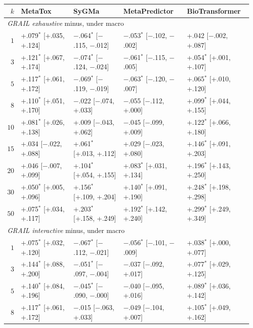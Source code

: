 \begin{table}[h]
\begin{threeparttable}
\begin{tabular}{rllll}
\toprule
$k$ & MetaTox & SyGMa & MetaPredictor & BioTransformer \\
\midrule
\multicolumn{5}{l}{\emph{GRAIL exhaustive} minus, under macro} \\
$1$ & +.079$^{*}$ [+.035, +.124] & $-$.064$^{*}$ [$-$.115, $-$.012] & $-$.053$^{*}$ [$-$.102, $-$.002] & +.042\phantom{$^{*}$} [$-$.002, +.087] \\
$3$ & +.121$^{*}$ [+.067, +.174] & $-$.074$^{*}$ [$-$.124, $-$.024] & $-$.061$^{*}$ [$-$.115, $-$.005] & +.054$^{*}$ [+.001, +.107] \\
$5$ & +.117$^{*}$ [+.061, +.172] & $-$.069$^{*}$ [$-$.119, $-$.019] & $-$.063$^{*}$ [$-$.120, $-$.007] & +.065$^{*}$ [+.010, +.120] \\
$8$ & +.110$^{*}$ [+.051, +.170] & $-$.022\phantom{$^{*}$} [$-$.074, +.033] & $-$.055\phantom{$^{*}$} [$-$.112, +.000] & +.099$^{*}$ [+.044, +.155] \\
$10$ & +.081$^{*}$ [+.026, +.138] & +.009\phantom{$^{*}$} [$-$.043, +.062] & $-$.045\phantom{$^{*}$} [$-$.099, +.009] & +.122$^{*}$ [+.066, +.180] \\
$15$ & +.034\phantom{$^{*}$} [$-$.022, +.088] & +.061$^{*}$ [+.013, +.112] & +.029\phantom{$^{*}$} [$-$.023, +.080] & +.146$^{*}$ [+.091, +.203] \\
$20$ & +.046\phantom{$^{*}$} [$-$.007, +.099] & +.104$^{*}$ [+.054, +.155] & +.083$^{*}$ [+.031, +.134] & +.196$^{*}$ [+.143, +.250] \\
$30$ & +.050$^{*}$ [+.005, +.096] & +.156$^{*}$ [+.109, +.204] & +.140$^{*}$ [+.091, +.190] & +.248$^{*}$ [+.198, +.298] \\
$50$ & +.075$^{*}$ [+.034, +.117] & +.203$^{*}$ [+.158, +.249] & +.192$^{*}$ [+.142, +.240] & +.299$^{*}$ [+.249, +.349] \\
\midrule
\multicolumn{5}{l}{\emph{GRAIL interactive} minus, under macro} \\
$1$ & +.075$^{*}$ [+.032, +.120] & $-$.067$^{*}$ [$-$.112, $-$.021] & $-$.056$^{*}$ [$-$.101, $-$.009] & +.038$^{*}$ [+.000, +.077] \\
$3$ & +.144$^{*}$ [+.088, +.200] & $-$.051$^{*}$ [$-$.097, $-$.004] & $-$.037\phantom{$^{*}$} [$-$.092, +.017] & +.077$^{*}$ [+.029, +.125] \\
$5$ & +.140$^{*}$ [+.084, +.196] & $-$.045$^{*}$ [$-$.090, $-$.000] & $-$.040\phantom{$^{*}$} [$-$.095, +.016] & +.089$^{*}$ [+.036, +.142] \\
$8$ & +.117$^{*}$ [+.061, +.172] & $-$.015\phantom{$^{*}$} [$-$.063, +.033] & $-$.049\phantom{$^{*}$} [$-$.104, +.007] & +.105$^{*}$ [+.049, +.162] \\

\end{tabular}
\end{threeparttable}
\end{table}
